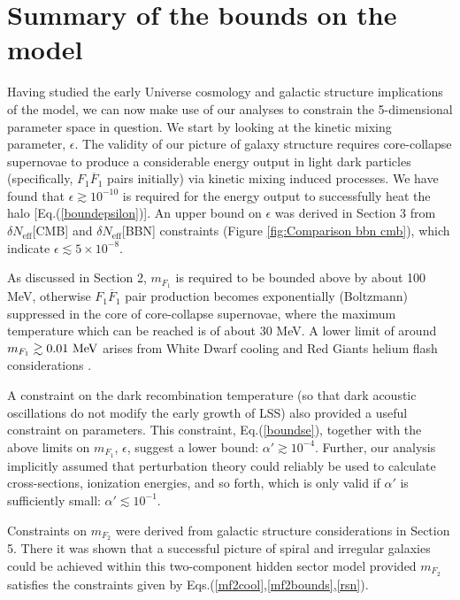 \documentclass[12pt]{article}
\begin{document}
{{\vskip 0.2cm

\section{Summary of the bounds on the model}

\vskip 0.1cm

Having studied the early Universe cosmology and galactic structure
implications of the model, we can now make use of our analyses to
constrain the 5-dimensional parameter space in question. We start by
looking at the kinetic mixing parameter, $\epsilon$. The validity of our
picture of galaxy structure requires core-collapse supernovae to produce
a considerable energy output in light dark particles (specifically,
$F_1\overline{F}_1$ pairs initially) via kinetic mixing induced
processes. We have found that $\epsilon \gtrsim 10 ^{-10}$ is required
for the energy output to successfully heat the halo
[Eq.(\ref{boundepsilon})]. An upper bound on $\epsilon$ was derived in
Section 3 from $\delta N _{\text{eff}}$[CMB] and $\delta N
_{\text{eff}}$[BBN] constraints (Figure \ref{fig:Comparison bbn cmb}),
which indicate $\epsilon \lesssim 5 \times 10 ^{-8}$.

As discussed in Section 2, $m _{F_1}$ is required to be bounded above by
about 100 MeV, otherwise $F _1\overline{F} _1$ pair production becomes
exponentially (Boltzmann) suppressed in the core of core-collapse
supernovae, where the maximum temperature which can be reached is of
about 30 MeV. A lower limit of around $m _{F_1} \gtrsim 0.01 \ \rm MeV$
arises from White Dwarf cooling  and Red Giants helium flash
considerations \cite{updated}.

A constraint on the dark recombination temperature (so that dark
acoustic oscillations do not modify the early growth of LSS) also
provided a useful constraint on parameters. This constraint,
Eq.(\ref{boundse}), together with the above limits on $m _{F_1}$,
$\epsilon$, suggest a lower bound: $\alpha ' \gtrsim 10 ^{-4}$. Further,
our analysis implicitly assumed that perturbation theory could reliably
be used to calculate cross-sections, ionization energies, and so forth,
which is only valid if $\alpha '$ is sufficiently small: $\alpha '
\lesssim 10 ^{-1}$.

Constraints on $m _{F_2}$ were derived from galactic structure
considerations in Section 5. There it was shown that a successful
picture of spiral and irregular galaxies could be achieved within this
two-component hidden sector model provided $m _{F_2}$ satisfies the
constraints given by Eqs.(\ref{mf2cool},\ref{mf2bounds},\ref{rsn}).

}}
\end{document}
